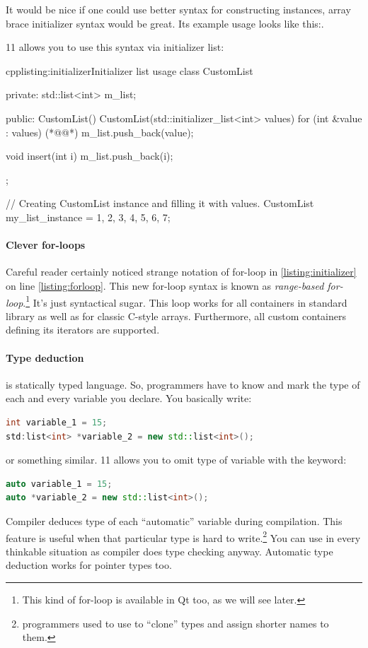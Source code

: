 It would be nice if one could use better syntax for constructing instances, array brace initializer syntax would be great. Its example usage looks like this:.

\cpp{} 11 allows you to use this syntax via initializer list:
\begin{fdoccode}{cpp}{listing:initializer}{Initializer list usage}
class CustomList {
	private:
		std::list<int> m_list;
	
	public:
		CustomList() { }
		CustomList(std::initializer_list<int> values) {
			for (int &value : values) {(*@\label{listing:forloop}@*)
				m_list.push_back(value);			
			}
		}
		
		void insert(int i) {
			m_list.push_back(i);		
		}
};

// Creating CustomList instance and filling it with values.
CustomList my_list_instance = {1, 2, 3, 4, 5, 6, 7};
\end{fdoccode}

\paragraph*{Clever for-loops}
Careful reader certainly noticed strange notation of for-loop in \autoref{listing:initializer} on line \ref{listing:forloop}. This new for-loop syntax is known as \textit{range-based for-loop}.\footnote{This kind of for-loop is available in Qt too, as we will see later.} It's just syntactical sugar. This loop works for all containers in standard library as well as for classic C-style arrays. Furthermore, all custom containers defining its iterators are supported.

\paragraph*{Type deduction}
\cpp{} is statically typed language. So, programmers have to know and mark the type of each and every variable you declare. You basically write:
\begin{lstlisting}[firstnumber=1,language=cpp]
int variable_1 = 15;
std:list<int> *variable_2 = new std::list<int>();
\end{lstlisting}
or something similar. \cpp{} 11 allows you to omit type of variable with the keyword:
\begin{lstlisting}[firstnumber=1,language=cpp]
auto variable_1 = 15;
auto *variable_2 = new std::list<int>();
\end{lstlisting}
Compiler deduces type of each \enquote{automatic} variable during compilation. This feature is useful when that particular type is hard to write.\footnote{\cpp{} programmers used to use to \enquote{clone} types and assign shorter names to them.} You can use in every thinkable situation as compiler does type checking anyway. Automatic type deduction works for pointer types too.

